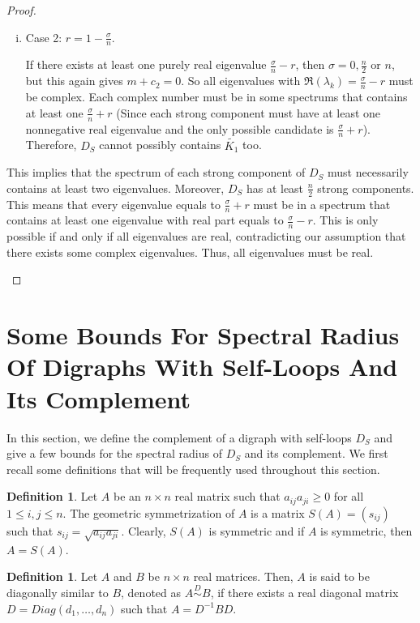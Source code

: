 \documentclass[12pt,a4paper,reqno]{amsart}
\numberwithin{equation}{section}
\theoremstyle{plain}
\theoremstyle{definition}
\newtheorem{definition}[theorem]{Definition}
\newcommand{\<}{\langle}
\renewcommand{\>}{\rangle}
\begin{document}
\begin{proof}
\begin{enumerate}
\begin{enumerate}
\begin{enumerate}[(i)]
            \item Case 2: $r=1-\frac{\sigma}{n}$. 
            
            If there exists at least one purely real eigenvalue $\frac{\sigma}{n}-r$, then $\sigma=0,\frac{n}{2}$ or $n$, but this again gives $m+c_2=0$. So all eigenvalues with $\Re(\lambda_k)=\frac{\sigma}{n}-r$ must be complex. Each complex number must be in some spectrums that contains at least one $\frac{\sigma}{n}+r$ (Since each strong component must have at least one nonnegative real eigenvalue and the only possible candidate is $\frac{\sigma}{n}+r$). Therefore, $D_S$ cannot possibly contains $\widetilde{K_1}$ too.
        \end{enumerate}
     
     This implies that the spectrum of each strong component of $D_S$ must necessarily contains at least two eigenvalues. Moreover, $D_S$ has at least $\frac{n}{2}$ strong components. This means that every eigenvalue equals to $\frac{\sigma}{n}+r$ must be in a spectrum that contains at least one eigenvalue with real part equals to $\frac{\sigma}{n}-r$. This is only possible if and only if all eigenvalues are real, contradicting our assumption that there exists some complex eigenvalues. Thus, all eigenvalues must be real.
    \end{enumerate}
\end{enumerate}
\end{proof}


\section{Some Bounds For Spectral Radius Of Digraphs With Self-Loops And Its Complement}
\label{sec5}
    In this section, we define the complement of a digraph with self-loops $D_S$ and give a few bounds for the spectral radius of $D_S$ and its complement. We first recall some definitions that will be frequently used throughout this section.

    \begin{definition} \cite{kolotilina1993perronroot}
        Let $A$ be an $n\times n$ real matrix such that $a_{ij}a_{ji}\geq0$ for all $1\leq i,j \leq n$. The geometric symmetrization of $A$ is a matrix $S(A)=(s_{ij})$ such that $s_{ij}=\sqrt{a_{ij}a_{ji}}.$ Clearly, $S(A)$ is symmetric and if $A$ is symmetric, then $A=S(A)$.
    \end{definition}

    \begin{definition}
    \cite{kolotilina1993perronroot}    
    Let $A$ and $B$ be $n\times n$ real matrices. Then, $A$ is said to be diagonally similar to $B$, denoted as $A \overset{D}{\sim} B$, if there exists a real diagonal matrix $D=Diag(d_1, \ldots, d_n)$ such that $A=D^{-1}BD$.
    \end{definition}
\end{document}
